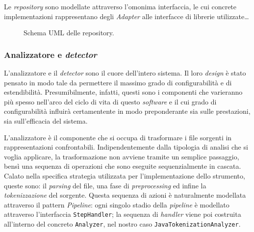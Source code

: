 Le \textit{repository} sono modellate attraverso l'omonima interfaccia, le cui concrete implementazioni rappresentano degli \textit{Adapter} \cite{gof} alle interfacce di librerie utilizzate\dots


\begin{figure}[h!]
    \caption{Schema UML delle repository.}
    \label{img:02-repos}
\end{figure}


\subsubsection*{Analizzatore e \textit{detector}}
L'analizzatore e il \textit{detector} sono il cuore dell'intero sistema.
%
Il loro \textit{design} è stato pensato in modo tale da permettere il massimo grado di configurabilità e di estendibilità.
%
Presumibilmente, infatti, questi sono i componenti che varieranno più spesso nell'arco del ciclo di vita di questo \textit{software} e il cui grado di configurabilità influirà certamentente in modo preponderante sia sulle prestazioni, sia sull'efficacia del sistema.

L'analizzatore è il componente che si occupa di trasformare i file sorgenti in rappresentazioni confrontabili.
%
Indipendentemente dalla tipologia di analisi che si voglia applicare, la trasformazione non avviene tramite un semplice passaggio, bensì una sequenza di operazioni che sono eseguite sequenzialmente in cascata.
%
Calato nella specifica strategia utilizzata per l'implementazione dello strumento, queste sono: il \textit{parsing} del file, una fase di \textit{preprocessing} ed infine la \textit{tokenizzazione} del sorgente.
%
Questa sequenza di azioni è naturalmente modellata attraverso il pattern \textit{Pipeline}: ogni singolo stadio della \textit{pipeline} \cite{pipeline-pattern} è modellato attraverso l'interfaccia \texttt{StepHandler}; la sequenza di \textit{handler} viene poi costruita all'interno del concreto \texttt{Analyzer}, nel nostro caso \texttt{JavaTokenizationAnalyzer}.
%
%

